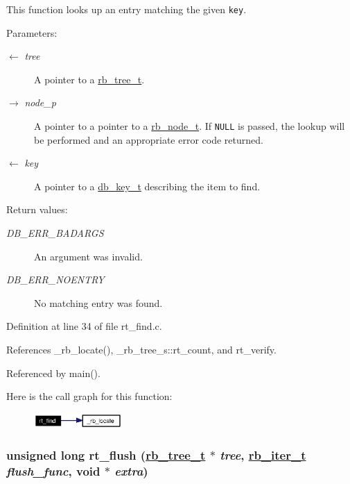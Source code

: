 This function looks up an entry matching the given {\tt key}.

\begin{Desc}
\item[Parameters:]
\begin{description}
\item[\mbox{$\leftarrow$} {\em tree}]A pointer to a \hyperlink{group__dbprim__rbtree_ga0}{rb\_\-tree\_\-t}. \item[\mbox{$\rightarrow$} {\em node\_\-p}]A pointer to a pointer to a \hyperlink{group__dbprim__rbtree_ga1}{rb\_\-node\_\-t}. If {\tt NULL} is passed, the lookup will be performed and an appropriate error code returned. \item[\mbox{$\leftarrow$} {\em key}]A pointer to a \hyperlink{group__dbprim_ga0}{db\_\-key\_\-t} describing the item to find.\end{description}
\end{Desc}
\begin{Desc}
\item[Return values:]
\begin{description}
\item[{\em DB\_\-ERR\_\-BADARGS}]An argument was invalid. \item[{\em DB\_\-ERR\_\-NOENTRY}]No matching entry was found.\end{description}
\end{Desc}


Definition at line 34 of file rt\_\-find.c.

References \_\-rb\_\-locate(), \_\-rb\_\-tree\_\-s::rt\_\-count, and rt\_\-verify.

Referenced by main().

Here is the call graph for this function:\begin{figure}[H]
\begin{center}
\leavevmode
\includegraphics[width=95pt]{group__dbprim__rbtree_ga9_cgraph}
\end{center}
\end{figure}
\hypertarget{group__dbprim__rbtree_ga12}{
\subsubsection[rt\_\-flush]{\setlength{\rightskip}{0pt plus 5cm}unsigned long rt\_\-flush (\hyperlink{struct__rb__tree__s}{rb\_\-tree\_\-t} $\ast$ {\em tree}, \hyperlink{group__dbprim__rbtree_ga2}{rb\_\-iter\_\-t} {\em flush\_\-func}, void $\ast$ {\em extra})}}
\label{group__dbprim__rbtree_ga12}


